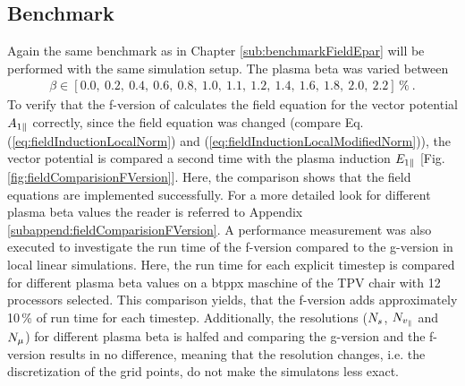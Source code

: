 \subsection{Benchmark}
\label{sub:benchmarkLinearFVersion}


Again the same benchmark as in Chapter \ref{sub:benchmarkFieldEpar} will be performed with the same simulation setup. The plasma beta was varied between
\begin{gather}
    \beta \in [0.0,~0.2,~0.4,~0.6,~0.8,~1.0,~1.1,~1.2,~1.4,~1.6,~1.8,~2.0,~2.2]\,\%~.
\end{gather}
To verify that the f-version of {\gkw} calculates the field equation for the vector potential $A_{1\parallel}$ correctly, since the field equation was changed (compare Eq. (\ref{eq:fieldInductionLocalNorm}) and (\ref{eq:fieldInductionLocalModifiedNorm})), the vector potential is compared a second time with the plasma induction $E_{1\parallel}$ [Fig. \ref{fig:fieldComparisionFVersion}]. Here, the comparison shows that the field equations are implemented successfully. For a more detailed look for different plasma beta values the reader is referred to Appendix \ref{subappend:fieldComparisionFVersion}. A performance measurement was also executed to investigate the run time of the f-version compared to the g-version in local linear simulations. Here, the run time for each explicit timestep is compared for different plasma beta values on a btppx maschine of the TPV chair with 12 processors selected. This comparison yields, that the f-version adds approximately 10\,\% of run time for each timestep. Additionally, the resolutions ($N_s$, $N_{v_\parallel}$ and $N_\mu$) for different plasma beta is halfed and comparing the g-version and the f-version results in no difference, meaning that the resolution changes, i.e. the discretization of the grid points, do not make the simulatons less exact.

